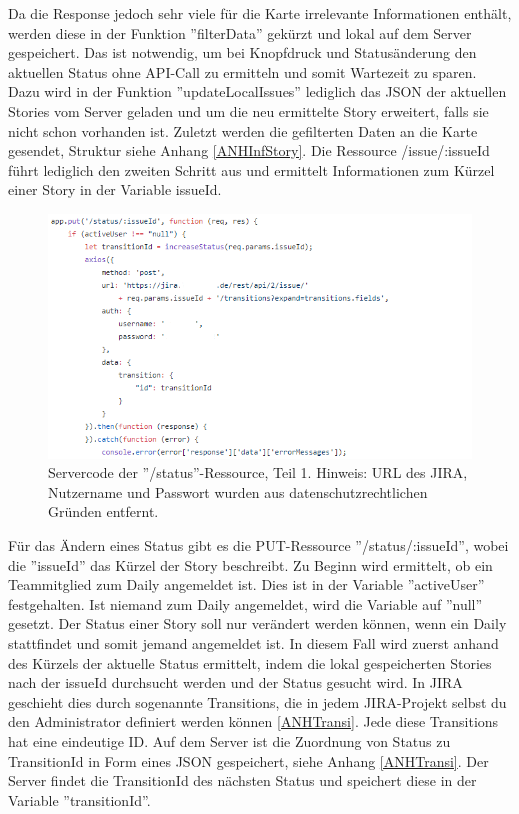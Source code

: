 \documentclass[12pt,titlepage]{scrartcl}
\begin{document}
			\noindent Da die Response jedoch sehr viele für die Karte irrelevante Informationen enthält, werden diese in der Funktion ''filterData'' gekürzt und lokal auf dem Server gespeichert. Das ist notwendig, um bei Knopfdruck und Statusänderung den aktuellen Status ohne API-Call zu ermitteln und somit Wartezeit zu sparen. Dazu wird in der Funktion ''updateLocalIssues'' lediglich das JSON der aktuellen Stories vom Server geladen und um die neu ermittelte Story erweitert, falls sie nicht schon vorhanden ist. Zuletzt werden die gefilterten Daten an die Karte gesendet, Struktur siehe Anhang \ref{ANHInfStory}. Die Ressource /issue/:issueId führt lediglich den zweiten Schritt aus und ermittelt Informationen zum Kürzel einer Story in der Variable issueId.
			\begin{figure}[H] 
  				\centering
    			\includegraphics[height=0.4\textheight]{serverStatus1}
  				\caption{Servercode der ''/status''-Ressource, Teil 1. Hinweis: URL des JIRA, Nutzername und Passwort wurden aus datenschutzrechtlichen Gründen entfernt.}
  				\label{fig:serverStatus1}
			\end{figure}
			\noindent Für das Ändern eines Status gibt es die PUT-Ressource ''/status/:issueId'', wobei die ''issueId'' das Kürzel der Story beschreibt. Zu Beginn wird ermittelt, ob ein Teammitglied zum Daily angemeldet ist. Dies ist in der Variable ''activeUser'' festgehalten. Ist niemand zum Daily angemeldet, wird die Variable auf ''null'' gesetzt. Der Status einer Story soll nur verändert werden können, wenn ein Daily stattfindet und somit jemand angemeldet ist. In diesem Fall wird zuerst anhand des Kürzels der aktuelle Status ermittelt, indem die lokal gespeicherten Stories nach der issueId durchsucht werden und der Status gesucht wird. In JIRA geschieht dies durch sogenannte Transitions, die in jedem JIRA-Projekt selbst du den Administrator definiert werden können \ref{ANHTransi}. Jede diese Transitions hat eine eindeutige ID. Auf dem Server ist die Zuordnung von Status zu TransitionId in Form eines JSON gespeichert, siehe Anhang \ref{ANHTransi}. Der Server findet die TransitionId des nächsten Status und speichert diese in der Variable ''transitionId''. 
\end{document}
